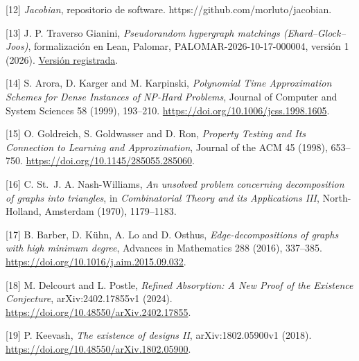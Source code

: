 \documentclass[spanish,11pt,a4paper]{article}
\begin{document}
{[}12{]} \emph{Jacobian}, repositorio de software. https://github.com/morluto/jacobian.

{[}13{]} J. P. Traverso Gianini, \emph{Pseudorandom hypergraph matchings (Ehard--Glock--Joos)}, formalización en Lean, Palomar, PALOMAR-2026-10-17-000004, versión 1 (2026). \href{https://palomar-registry.org/entry.html?id=PALOMAR-2026-10-17-000004&version=1}{Versión registrada}.

{[}14{]} S. Arora, D. Karger and M. Karpinski, \emph{Polynomial Time Approximation Schemes for Dense Instances of NP-Hard Problems}, Journal of Computer and System Sciences 58 (1999), 193--210. \url{https://doi.org/10.1006/jcss.1998.1605}.

{[}15{]} O. Goldreich, S. Goldwasser and D. Ron, \emph{Property Testing and Its Connection to Learning and Approximation}, Journal of the ACM 45 (1998), 653--750. \url{https://doi.org/10.1145/285055.285060}.

{[}16{]} C. St.~J. A. Nash-Williams, \emph{An unsolved problem concerning decomposition of graphs into triangles}, in \emph{Combinatorial Theory and its Applications III}, North-Holland, Amsterdam (1970), 1179--1183.

{[}17{]} B. Barber, D. Kühn, A. Lo and D. Osthus, \emph{Edge-decompositions of graphs with high minimum degree}, Advances in Mathematics 288 (2016), 337--385. \url{https://doi.org/10.1016/j.aim.2015.09.032}.

{[}18{]} M. Delcourt and L. Postle, \emph{Refined Absorption: A New Proof of the Existence Conjecture}, arXiv:2402.17855v1 (2024). \url{https://doi.org/10.48550/arXiv.2402.17855}.

{[}19{]} P. Keevash, \emph{The existence of designs II}, arXiv:1802.05900v1 (2018). \url{https://doi.org/10.48550/arXiv.1802.05900}.

\endgroup
\end{document}
